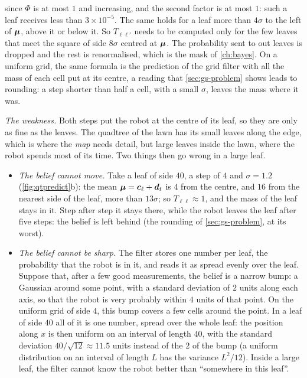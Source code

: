 since $\Phi$ is at most $1$ and increasing, and the second factor is at
most $1$: such a leaf receives less than $3\times10^{-5}$. The same holds
for a leaf more than $4\sigma$ to the left of $\bm{\mu}$, above it or
below it. So $T_{\ell\ell'}$ needs to be computed only for the few leaves
that meet the square of side $8\sigma$ centred at $\bm{\mu}$. The probability sent to out leaves is dropped and the rest is
renormalised, which is the mask of \cref{ch:bayes}. On a uniform grid,
the same formula is the prediction of the grid filter with all the mass
of each cell put at its centre, a reading that \cref{sec:gs-problem}
shows leads to rounding: a step shorter than half a cell, with a small
$\sigma$, leaves the mass where it was.

\emph{The weakness.} Both steps put the robot at the centre of its leaf,
so they are only as fine as the leaves. The quadtree of the lawn has its
small leaves along the edge, which is where the \emph{map} needs detail,
but large leaves inside the lawn, where the robot spends most of its
time. Two things then go wrong in a large leaf.
\begin{itemize}[nosep]
  \item \emph{The belief cannot move.} Take a leaf of side $40$, a step
        of $4$ and $\sigma=1.2$ (\cref{fig:qtpredict}b): the mean
        $\bm{\mu}=\bm{c}_\ell+\bm{d}_t$ is $4$ from the centre, and
        $16$ from the nearest side of the leaf, more than $13\sigma$; so
        $T_{\ell\ell}\approx1$, and the mass of the leaf stays in it.
        Step after step it stays there, while the robot leaves the leaf after
five steps: the belief is left behind (the rounding of
\cref{sec:gs-problem}, at its worst).
  \item \emph{The belief cannot be sharp.} The filter stores one number
        per leaf, the probability that the robot is in it, and reads it
        as spread evenly over the leaf. Suppose that, after a few good measurements, the belief is a narrow
bump: a Gaussian around some point, with a standard deviation of $2$
units along each axis, so that the robot is very probably within $4$
units of that point. On the uniform grid of side $4$, this bump covers a
few cells around the point. In a leaf of side $40$ all
        of it is one number, spread over the whole leaf: the position
        along $x$ is then uniform on an interval of length $40$, with the standard deviation $40/\sqrt{12}\approx11.5$ units instead of
the $2$ of the bump (a uniform distribution on an interval of length $L$ has the variance
$L^2/12$). Inside a large leaf, the filter cannot know the robot
        better than ``somewhere in this leaf''.
\end{itemize}
